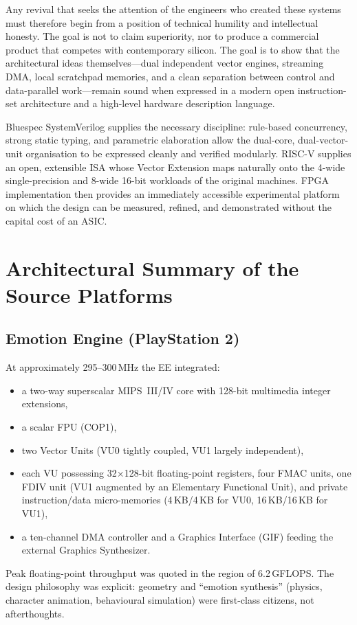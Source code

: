 \documentclass[11pt,a4paper]{article}
\begin{document}
Any revival that seeks the attention of the engineers who created these systems must therefore begin from a position of technical humility and intellectual honesty. The goal is not to claim superiority, nor to produce a commercial product that competes with contemporary silicon. The goal is to show that the architectural ideas themselves---dual independent vector engines, streaming DMA, local scratchpad memories, and a clean separation between control and data-parallel work---remain sound when expressed in a modern open instruction-set architecture and a high-level hardware description language.

Bluespec SystemVerilog supplies the necessary discipline: rule-based concurrency, strong static typing, and parametric elaboration allow the dual-core, dual-vector-unit organisation to be expressed cleanly and verified modularly. RISC-V supplies an open, extensible ISA whose Vector Extension maps naturally onto the 4-wide single-precision and 8-wide 16-bit workloads of the original machines. FPGA implementation then provides an immediately accessible experimental platform on which the design can be measured, refined, and demonstrated without the capital cost of an ASIC.

\section{Architectural Summary of the Source Platforms}

\subsection{Emotion Engine (PlayStation 2)}

At approximately 295--300\,MHz the EE integrated:
\begin{itemize}[leftmargin=1.5em]
  \item a two-way superscalar MIPS~III/IV core with 128-bit multimedia integer extensions,
  \item a scalar FPU (COP1),
  \item two Vector Units (VU0 tightly coupled, VU1 largely independent),
  \item each VU possessing 32$\times$128-bit floating-point registers, four FMAC units, one FDIV unit (VU1 augmented by an Elementary Functional Unit), and private instruction/data micro-memories (4\,KB/4\,KB for VU0, 16\,KB/16\,KB for VU1),
  \item a ten-channel DMA controller and a Graphics Interface (GIF) feeding the external Graphics Synthesizer.
\end{itemize}
Peak floating-point throughput was quoted in the region of 6.2\,GFLOPS. The design philosophy was explicit: geometry and ``emotion synthesis'' (physics, character animation, behavioural simulation) were first-class citizens, not afterthoughts.
\end{document}
